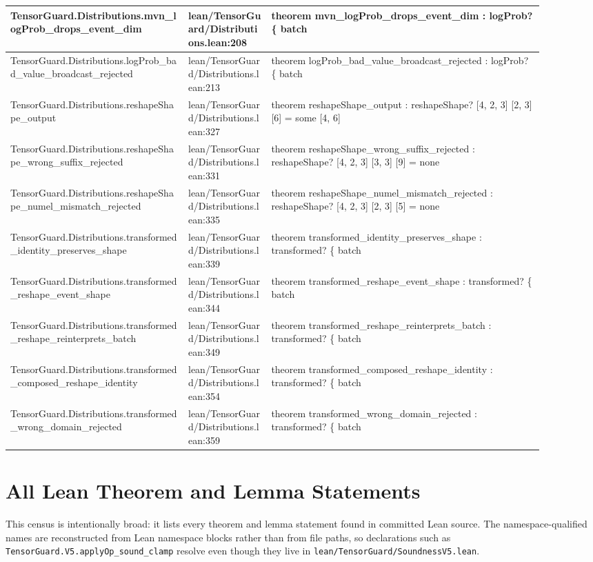 \documentclass[10pt]{article}
\begin{document}
\begin{longtable}{|p{0.30\linewidth}|p{0.14\linewidth}|p{0.46\linewidth}|}
\hline
TensorGuard.Distributions.mvn\_logProb\_drops\_event\_dim & lean/TensorGuard/Distributions.lean:208 & theorem mvn\_logProb\_drops\_event\_dim : logProb? \{ batch \\
\hline
TensorGuard.Distributions.logProb\_bad\_value\_broadcast\_rejected & lean/TensorGuard/Distributions.lean:213 & theorem logProb\_bad\_value\_broadcast\_rejected : logProb? \{ batch \\
\hline
TensorGuard.Distributions.reshapeShape\_output & lean/TensorGuard/Distributions.lean:327 & theorem reshapeShape\_output : reshapeShape? [4, 2, 3] [2, 3] [6] = some [4, 6] \\
\hline
TensorGuard.Distributions.reshapeShape\_wrong\_suffix\_rejected & lean/TensorGuard/Distributions.lean:331 & theorem reshapeShape\_wrong\_suffix\_rejected : reshapeShape? [4, 2, 3] [3, 3] [9] = none \\
\hline
TensorGuard.Distributions.reshapeShape\_numel\_mismatch\_rejected & lean/TensorGuard/Distributions.lean:335 & theorem reshapeShape\_numel\_mismatch\_rejected : reshapeShape? [4, 2, 3] [2, 3] [5] = none \\
\hline
TensorGuard.Distributions.transformed\_identity\_preserves\_shape & lean/TensorGuard/Distributions.lean:339 & theorem transformed\_identity\_preserves\_shape : transformed? \{ batch \\
\hline
TensorGuard.Distributions.transformed\_reshape\_event\_shape & lean/TensorGuard/Distributions.lean:344 & theorem transformed\_reshape\_event\_shape : transformed? \{ batch \\
\hline
TensorGuard.Distributions.transformed\_reshape\_reinterprets\_batch & lean/TensorGuard/Distributions.lean:349 & theorem transformed\_reshape\_reinterprets\_batch : transformed? \{ batch \\
\hline
TensorGuard.Distributions.transformed\_composed\_reshape\_identity & lean/TensorGuard/Distributions.lean:354 & theorem transformed\_composed\_reshape\_identity : transformed? \{ batch \\
\hline
TensorGuard.Distributions.transformed\_wrong\_domain\_rejected & lean/TensorGuard/Distributions.lean:359 & theorem transformed\_wrong\_domain\_rejected : transformed? \{ batch \\
\hline
\end{longtable}

\section{All Lean Theorem and Lemma Statements}
This census is intentionally broad: it lists every theorem and lemma statement found in committed Lean source.  The namespace-qualified names are reconstructed from Lean namespace blocks rather than from file paths, so declarations such as \texttt{TensorGuard.V5.applyOp\_sound\_clamp} resolve even though they live in \texttt{lean/TensorGuard/SoundnessV5.lean}.
\end{document}

